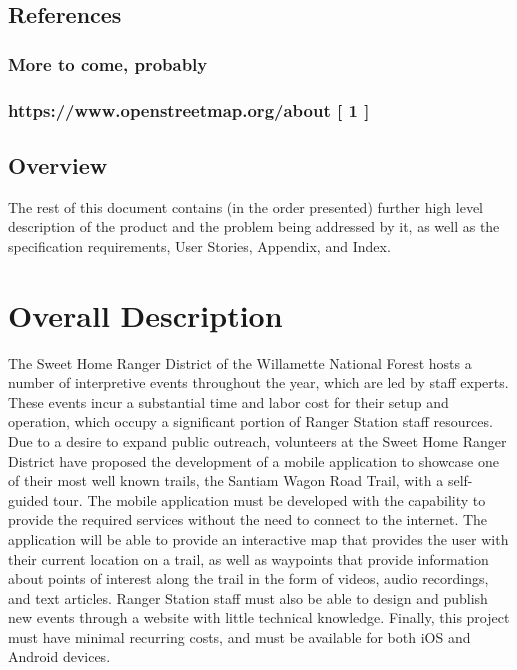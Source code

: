 \documentclass[letterpaper, 10pt,titlepage]{article}
\begin{document}
\subsection{References}
\subsubsection{More to come, probably}
\subsubsection{https://www.openstreetmap.org/about [ 1 ]}
\vspace{0.3cm}

\subsection{Overview}
The rest of this document contains (in the order presented) further high level description of the product and the problem being addressed by it, as well as the specification requirements, User Stories, Appendix, and Index. 



\section{Overall Description}
The Sweet Home Ranger District of the Willamette National Forest hosts a number of interpretive events throughout the year, which are led by staff experts. These events incur a substantial time and labor  cost for their setup and operation, which occupy a significant portion of Ranger Station staff resources.  Due to a desire to expand public outreach, volunteers at the Sweet Home Ranger District have proposed the development of a mobile application to showcase one of their most well known trails, the Santiam Wagon Road Trail, with a self-guided tour. The mobile application must be developed with the capability to provide the required services without the need to connect to the internet. The application will be able to provide an interactive map that provides the user with their current location on a trail, as well as waypoints that provide information about points of interest along the trail in the form of videos, audio recordings, and text articles. Ranger Station staff must also be able to design and publish new events through a website with little technical knowledge. Finally, this project must have minimal recurring costs, and must be available for both iOS and Android devices.
\end{document}
